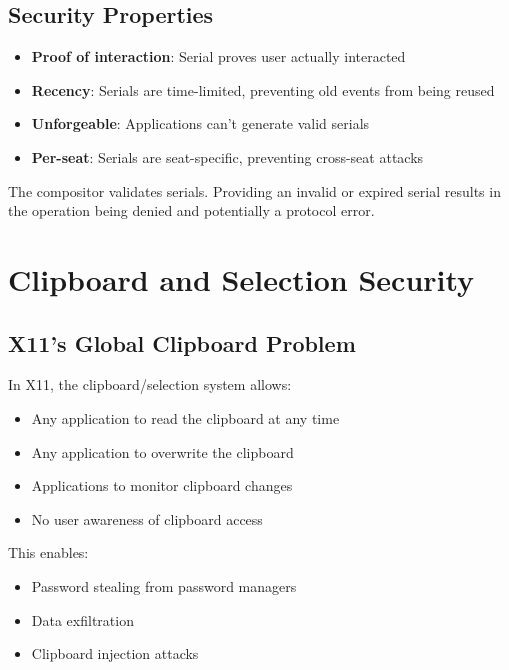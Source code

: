 \subsection{Security Properties}

\begin{itemize}
    \item \textbf{Proof of interaction}: Serial proves user actually interacted
    \item \textbf{Recency}: Serials are time-limited, preventing old events from being reused
    \item \textbf{Unforgeable}: Applications can't generate valid serials
    \item \textbf{Per-seat}: Serials are seat-specific, preventing cross-seat attacks
\end{itemize}

\begin{warningbox}
The compositor validates serials. Providing an invalid or expired serial results in the operation being denied and potentially a protocol error.
\end{warningbox}

\section{Clipboard and Selection Security}

\subsection{X11's Global Clipboard Problem}

In X11, the clipboard/selection system allows:
\begin{itemize}
    \item Any application to read the clipboard at any time
    \item Any application to overwrite the clipboard
    \item Applications to monitor clipboard changes
    \item No user awareness of clipboard access
\end{itemize}

This enables:
\begin{itemize}
    \item Password stealing from password managers
    \item Data exfiltration
    \item Clipboard injection attacks
\end{itemize}


